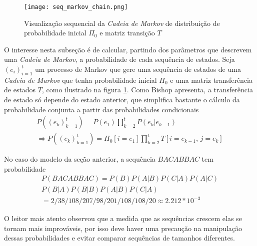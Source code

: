 \documentclass{subfiles}
\begin{document}
\begin{figure}
	\texttt{[image: seq\_markov\_chain.png]}
	\caption{Visualização sequencial da \textit{Cadeia de Markov} de distribuição de probabilidade inicial $\Pi_0$ e matriz transição $T$}
	\label{fig:seq_mc}
\end{figure}

O interesse nesta subseção é de calcular, partindo dos parâmetros que descrevem uma \textit{Cadeia de Markov}, a probabilidade de cada sequência de estados. Seja $(e_i)_{i=1}^t$ um processo de Markov que gere uma sequência de estados de uma \textit{Cadeia de Markov} que tenha probabilidade inicial $\Pi_0$ e uma matriz transferência de estados $T$, como ilustrado na figura \ref{fig:seq_mc}. Como Bishop \autocite{Bishop:2006pat} apresenta, a transferência de estado só depende do estado anterior, que simplifica bastante o cálculo da probabilidade conjunta a partir das probabilidades condicionais
\begin{gather*}
	P((e_k)_{k=1}^t) = P(e_1) \prod_{k=2}^t P(e_{k} \vert e_{k-1}) \\
	\Rightarrow P((e_k)_{k=1}^t) = \Pi_0[i=e_1] \prod_{k=2}^t T[i=e_{k-1},\, j=e_{k}]
\end{gather*}

No caso do modelo da seção anterior, a sequência $BACABBAC$ tem probabilidade
\begin{gather*}
	P(BACABBAC) = P(B) P(A|B) P(C|A) P(A|C) \\
	P(B|A) P(B|B) P(A|B) P(C|A) \\
	= 2/3 8/10 8/20 7/9 8/20 1/10 8/10 8/20 \approx 2.212 * 10^{-3}
\end{gather*}

O leitor mais atento observou que a medida que as sequências crescem elas se tornam mais improváveis, por isso deve haver uma precaução na manipulação dessas probabilidades e evitar comparar sequências de tamanhos diferentes.


\end{document}
